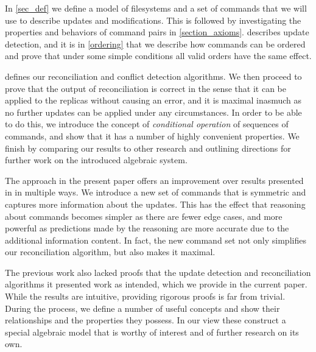 In \cref{sec_def} we define a model of filesystems and a set of commands
that we will use to describe updates and modifications.
This is followed by investigating the properties and behaviors
of command pairs in \cref{section_axioms}.
 describes update detection, and it is
in \cref{ordering} that we describe how commands can be ordered
and prove that under some simple conditions all valid orders
have the same effect.

 defines our reconciliation 
and conflict detection algorithms.
We then proceed to prove that the output of reconciliation
is correct in the sense that 
it can be applied to the replicas without causing an error,
and it is maximal
inasmuch as no further updates can be applied under any circumstances.
In order to be able to do this, we introduce
the concept of \emph{conditional operation} of sequences of commands,
and show that it has a number of highly convenient properties.
We finish by comparing our results to other research
and outlining directions for further work
on the introduced algebraic system.

The approach in the present paper offers an improvement
over results presented in \cite{NREC} in multiple ways.
We introduce a new set of commands that is symmetric and
captures more information about the updates.
This has the effect that reasoning about commands
becomes simpler as there are fewer edge cases,
and more powerful as 
predictions made by the reasoning are more accurate
due to the additional information content.
In fact, the new command set not only simplifies
our reconciliation algorithm, but also makes it maximal.

The previous work also lacked proofs that the update detection
and reconciliation algorithms it presented work as intended,
which we provide in the current paper.
While the results are intuitive, providing rigorous proofs
is far from trivial.
During the process, we define a number of useful concepts
and show their relationships and the properties they possess.
In our view these construct a special algebraic model
that is worthy of interest and of further research on its own.

